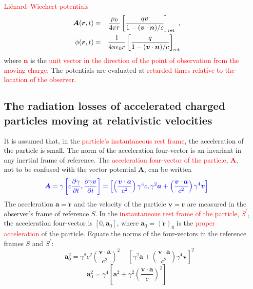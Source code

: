 \documentclass[12pt,a4paper]{article}
\renewcommand{\vec}[1]{\boldsymbol{#1}}
\begin{document}
\textcolor{red}{Li\'{e}nard–Wiechert potentials}
\begin{eqnarray}
\vec{A}(\vec{r}, t)  &=& \frac{\mu_0}{4\pi r} \left[\frac{q\vec{v}}{1-(\vec{v}\cdot \vec{n})/c}  \right]_{\rm ret} ~, \\
\phi(\vec{r}, t) &=& \frac{1}{4\pi \epsilon_0 r} \left[\frac{q}{1-(\vec{v}\cdot \vec{n})/c}  \right]_{\rm ret} 
\end{eqnarray}
where \textcolor{red}{$\vec{n}$} is the \textcolor{red}{unit vector in the direction of the point of observation from the moving charge}. The potentials are evaluated at \textcolor{red}{retarded times relative to the location of the observer}.


\subsection{The radiation losses of accelerated charged particles moving at relativistic velocities}
It is assumed that, in the \textcolor{red}{particle’s instantaneous rest frame}, the acceleration of the particle is small. The norm of the acceleration four-vector is an invariant in any inertial frame of reference. The \textcolor{red}{acceleration four-vector of the particle}, \textcolor{red}{$\vec{A}$}, not to be confused with the vector potential $\vec{A}$, can be written
\begin{eqnarray}
\textcolor{blue}{ \vec{A} = \gamma \left[c\frac{\partial \gamma}{\partial t} ,  \frac{\partial \gamma \vec{v}}{\partial t}  \right]  = \left[\left(\frac{\vec{v}\cdot \vec{a}}{c^2}\right) \gamma^4 c,  \gamma^2 \vec{a} +\left(\frac{\vec{v}\cdot \vec{a}}{c^2}\right) \gamma^4 \vec{v}  \right] }
\end{eqnarray}
The acceleration $\vec{a} = \vec{\ddot{r}}$ and the velocity of the particle $\vec{v} = \vec{\dot{r}}$ are measured in the observer’s frame of reference $S$. In the \textcolor{red}{instantaneous rest frame of the particle}, \textcolor{red}{$S^{\prime}$}, the acceleration four-vector is $[0, \vec{a}_0]$, where $\vec{a}_0 = (\vec{\ddot{r}})_0$ is the \textcolor{red}{proper acceleration} of the particle. Equate the norms of the four-vectors in the reference frames $S$ and $S^{\prime}$:
\begin{equation}
-\vec{a}^2_0 = \gamma^8 c^2 \left(\frac{\vec{v}\cdot \vec{a}}{c^2}\right)^2 - \left[\gamma^2 \vec{a} +\left(\frac{\vec{v}\cdot \vec{a}}{c^2}\right) \gamma^4 \vec{v} \right]^2
\end{equation}
\begin{equation}
\vec{a}^2_0 = \gamma^4 \left[ \vec{a}^2 +\gamma^2 \left(\frac{\vec{v}\cdot \vec{a}}{c}\right)^2 \right]
\end{equation}
\end{document}
